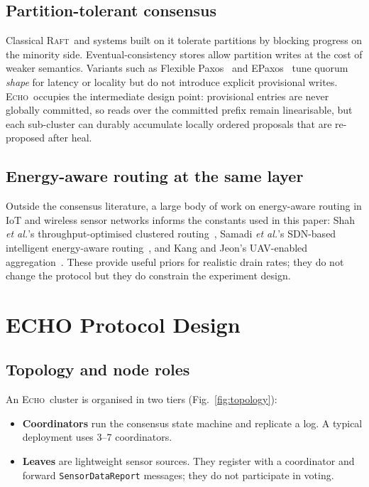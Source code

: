 \documentclass[conference]{IEEEtran}
\newcommand{\echoproto}{\textsc{Echo}\xspace}
\newcommand{\raftproto}{\textsc{Raft}\xspace}
\begin{document}
\subsection{Partition-tolerant consensus}
Classical \raftproto\ and systems built on it tolerate partitions by
blocking progress on the minority side. Eventual-consistency stores
allow partition writes at the cost of weaker semantics. Variants such
as Flexible Paxos~\cite{howard2016flexible} and
EPaxos~\cite{moraru2013epaxos} tune quorum \emph{shape} for latency or
locality but do not introduce explicit provisional writes. \echoproto\
occupies the intermediate design point: provisional entries are never
globally committed, so reads over the committed prefix remain
linearisable, but each sub-cluster can durably accumulate locally
ordered proposals that are re-proposed after heal.

\subsection{Energy-aware routing at the same layer}
Outside the consensus literature, a large body of work on energy-aware
routing in IoT and wireless sensor networks informs the constants used
in this paper: Shah \emph{et al.}'s throughput-optimised clustered
routing~\cite{shah2018energy}, Samadi \emph{et al.}'s SDN-based
intelligent energy-aware routing~\cite{samadi2023intelligent}, and
Kang and Jeon's UAV-enabled aggregation~\cite{kang2024uav}. These
provide useful priors for realistic drain rates; they do not change the
protocol but they do constrain the experiment design.

\section{ECHO Protocol Design}\label{sec:design}

\subsection{Topology and node roles}
An \echoproto\ cluster is organised in two tiers
(Fig.~\ref{fig:topology}):
\begin{itemize}
\item \textbf{Coordinators} run the consensus state machine and
  replicate a log. A typical deployment uses 3--7 coordinators.
\item \textbf{Leaves} are lightweight sensor sources. They register
  with a coordinator and forward \texttt{SensorDataReport} messages;
  they do not participate in voting.
\end{itemize}
\end{document}
